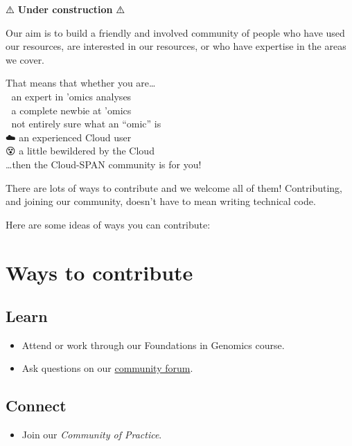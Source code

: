 \documentclass[
]{book}
\providecommand{\tightlist}{%
  \setlength{\itemsep}{0pt}\setlength{\parskip}{0pt}}
\begin{document}
⚠️ \textbf{Under construction} ⚠️

Our aim is to build a friendly and involved community of people who have used our resources, are interested in our resources, or who have expertise in the areas we cover.

That means that whether you are\ldots{}\\

🧬 an expert in 'omics analyses\\
🤔 a complete newbie at 'omics\\
🤷 not entirely sure what an ``omic'' is\\
☁️ an experienced Cloud user\\
😵 a little bewildered by the Cloud\\

\ldots then the Cloud-SPAN community is for you!

There are lots of ways to contribute and we welcome all of them! Contributing, and joining our community, doesn't have to mean writing technical code.

Here are some ideas of ways you can contribute:

\hypertarget{ways-to-contribute}{%
\section{Ways to contribute}\label{ways-to-contribute}}

\hypertarget{learn}{%
\subsection*{Learn}\label{learn}}

\begin{itemize}
\tightlist
\item
  Attend or work through our Foundations in Genomics course.
\item
  Ask questions on our \href{https://cloudspan.peerboard.com/}{community forum}.
\end{itemize}

\hypertarget{connect}{%
\subsection*{Connect}\label{connect}}

\begin{itemize}
\tightlist
\item
  Join our \emph{Community of Practice}.
\end{itemize}
\end{document}
